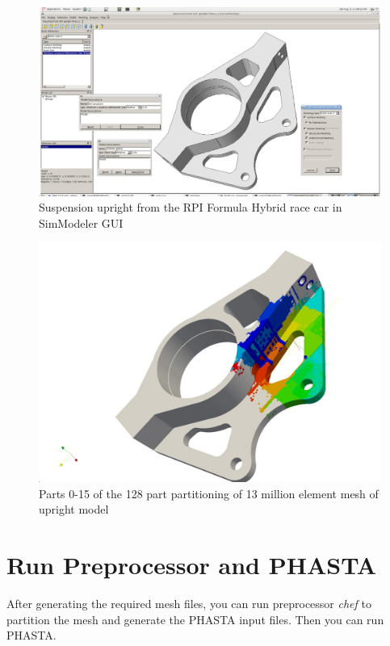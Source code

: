 \documentclass{article}
\begin{document}
\begin{figure}[h!]
\centering
\includegraphics[width=1\textwidth]{albany1}
\caption{Suspension upright from the RPI Formula Hybrid race car in SimModeler GUI}
\label{fig:3} 
\end{figure}
\begin{figure}[h!]
\centering
\includegraphics[width=1\textwidth]{albany2}
\caption{Parts 0-15 of the 128 part partitioning of 13 million element mesh of upright model}
\label{fig:4} 
\end{figure}

\section{Run Preprocessor and PHASTA}
After generating the required mesh files, you can run preprocessor \textit{chef} to partition the mesh and generate the PHASTA input files. Then you can run PHASTA.
\end{document}
